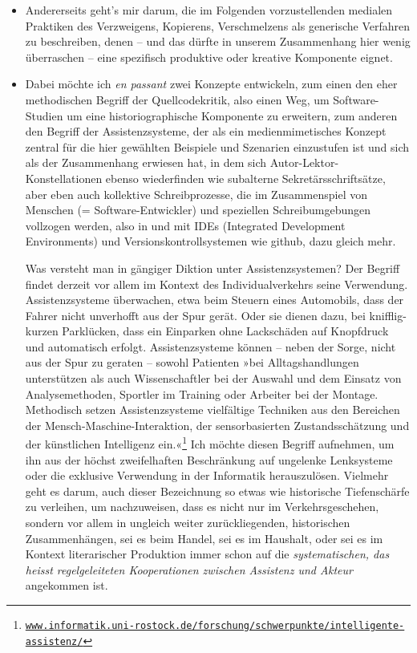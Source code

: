 \documentclass[a4paper,11pt]{article}
\newcommand{\anf}[1]{»#1«}
\begin{document}
\begin{itemize}
\item Andererseits geht's mir darum, die im Folgenden vorzustellenden medialen Praktiken des Verzweigens, Kopierens, Verschmelzens als generische Verfahren zu beschreiben, denen – und das dürfte in unserem Zusammenhang hier wenig überraschen – eine spezifisch produktive oder kreative Komponente eignet.   

\item Dabei möchte ich \emph{en passant} zwei Konzepte entwickeln, zum einen den eher methodischen Begriff der Quellcodekritik, also einen Weg, um Software-Studien um eine historiographische Komponente zu  erweitern, zum anderen den Begriff der Assistenzsysteme, der als ein medienmimetisches Konzept zentral für die hier gewählten Beispiele und Szenarien einzustufen ist und sich als der Zusammenhang erwiesen hat, in dem sich Autor-Lektor-Konstellationen ebenso wiederfinden wie subalterne Sekretärsschriftsätze, aber eben auch kollektive Schreibprozesse, die im Zusammenspiel von Menschen (= Software-Entwickler) und speziellen Schreibumgebungen vollzogen werden, also in und mit IDEs (Integrated Development Environments) und Versionskontrollsystemen wie github, dazu gleich mehr.   

Was versteht man in gängiger Diktion unter Assistenzsystemen? Der Begriff findet derzeit vor allem im Kontext des Individualverkehrs seine Verwendung. Assistenzsysteme überwachen, etwa beim Steuern eines Automobils, dass der Fahrer nicht unverhofft aus der Spur gerät. Oder sie dienen dazu, bei knifflig-kurzen Parklücken, dass ein Einparken ohne Lackschäden auf Knopfdruck und automatisch erfolgt. Assistenzsysteme können – neben der Sorge, nicht aus der Spur zu geraten – sowohl Patienten \anf{bei Alltagshandlungen unterstützen als auch Wissenschaftler bei der Auswahl und dem Einsatz von Analysemethoden, Sportler im Training oder Arbeiter bei der Montage. Methodisch setzen Assistenzsysteme vielfältige Techniken aus den Bereichen der Mensch-Maschine-Interaktion, der sensorbasierten Zustandsschätzung und der künstlichen Intelligenz ein.}\footnote{\href{https://www.informatik.uni-rostock.de/forschung/schwerpunkte/intelligente-assistenz/}{\texttt{www.informatik.uni-rostock.de/forschung/schwerpunkte/intelligente-assistenz/}}} Ich möchte diesen Begriff aufnehmen, um ihn aus der höchst zweifelhaften Beschränkung auf ungelenke Lenksysteme oder die exklusive Verwendung in der Informatik herauszulösen. Vielmehr geht es darum, auch dieser Bezeichnung so etwas wie historische Tiefenschärfe zu verleihen, um nachzuweisen, dass es nicht nur im Verkehrsgeschehen, sondern vor allem in ungleich weiter zurückliegenden, historischen Zusammenhängen, sei es beim Handel, sei es im Haushalt, oder sei es im Kontext literarischer Produktion immer schon auf die \emph{systematischen, das heisst regelgeleiteten Kooperationen zwischen Assistenz und Akteur} angekommen ist. 


\end{itemize}
\end{document}
